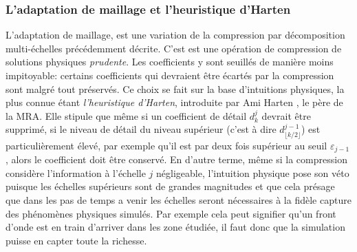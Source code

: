     \subsubsection{L'adaptation de maillage et l'heuristique d'Harten}
            L'adaptation de maillage, est une variation de la compression par décomposition multi-échelles précédemment décrite. 
            C'est est une opération de compression de solutions physiques \textit{prudente}.
            Les coefficients y sont seuillés de manière moins impitoyable: certains coefficients qui devraient être écartés
            par la compression sont malgré tout préservés. Ce choix se fait sur la base d'intuitions physiques, 
            la plus connue étant \textit{l'heuristique d'Harten}, introduite par Ami Harten \cite{harten1994}, le père de la MRA.
            Elle stipule que même si un coefficient de détail $d_k^j$ devrait être supprimé, si le niveau de détail du niveau supérieur 
            (c'est à dire $d^{j-1}_{\lfloor k/2 \rfloor}$) est particulièrement élevé, par exemple qu'il est par deux fois supérieur au seuil $\varepsilon_{j-1}$,
            alors le coefficient doit être conservé. En d'autre terme, même si la compression considère l'information à l'échelle $j$ négligeable,
            l'intuition physique pose son véto puisque les échelles supérieurs sont de grandes magnitudes et que cela présage que dans 
            les pas de temps a venir les échelles seront nécessaires à la fidèle capture des phénomènes physiques simulés. Par exemple cela peut signifier qu'un front
            d'onde est en train d'arriver dans les zone étudiée, il faut donc que la simulation puisse en capter toute la richesse.
